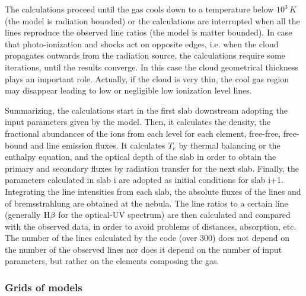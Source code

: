 \documentclass[../main.tex]{subfiles}
\begin{document}
The calculations proceed until the gas cools down to a temperature below $10^3\,\si{K}$ (the model is radiation bounded) or the calculations are interrupted when all the lines reproduce the observed line ratios (the model is matter bounded).
In case that photo-ionization and shocks act on opposite edges, i.e. when the cloud propagates outwards from the 
radiation source, the calculations require some iterations, until the results converge.
In this case  the cloud geometrical thickness plays an important role.  
Actually, if the cloud is very thin, the cool gas region may disappear leading to low or negligible low ionization level lines. 

Summarizing, the calculations start in the first slab downstream adopting the input parameters  given by the model.
Then, it calculates the density, the fractional abundances of the ions from each level for each element, free-free,  free-bound  and line emission fluxes. 
It calculates $T_e$ by thermal balancing or the enthalpy equation, and the optical depth of the slab  in order to obtain the primary and secondary fluxes by radiation transfer for the next slab. 
Finally,  the parameters  calculated in slab i are adopted as initial conditions for slab i+1. 
Integrating the line intensities from each slab, the absolute fluxes of the lines and of bremsstrahlung are obtained at the nebula. 
The line ratios to a certain line (generally $\rm H\beta$ for the optical-UV spectrum) are then calculated and compared with the observed data, in order to avoid problems of distances, absorption, etc.
The number of the lines calculated by the code (over 300) does not depend on the number of
the observed lines nor does it depend on the number of  input parameters,
but rather on the elements composing the gas.

\subsubsection{Grids of models}
\end{document}
